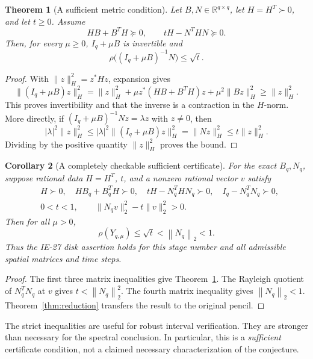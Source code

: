 \documentclass[11pt,letterpaper]{article}
\newtheorem{theorem}{Theorem}[section]
\newtheorem{corollary}[theorem]{Corollary}
\theoremstyle{remark}
\newcommand{\R}{\mathbb R}
\newcommand{\Id}{I}
\newcommand{\norm}[1]{\left\|#1\right\|_2}
\begin{document}
\begin{theorem}[A sufficient metric condition]\label{thm:energy}
Let \(B,N\in\R^{q\times q}\), let \(H=H^T\succ0\), and let \(t\ge0\).
Assume
\begin{equation}\label{eq:LMIs}
 HB+B^TH\succeq0,\qquad tH-N^THN\succeq0.
\end{equation}
Then, for every \(\mu\ge0\), \(\Id_q+\mu B\) is invertible and
\begin{equation}\label{eq:energy-result}
 \rho\big((\Id_q+\mu B)^{-1}N\big)\le\sqrt t.
\end{equation}
\end{theorem}
\begin{proof}
With \(\|z\|_H^2=z^*Hz\), expansion gives
\[
 \|(\Id_q+\mu B)z\|_H^2
 =\|z\|_H^2+\mu z^*(HB+B^TH)z+\mu^2\|Bz\|_H^2
 \ge\|z\|_H^2.
\]
This proves invertibility and that the inverse is a contraction in the
\(H\)-norm. More directly, if
\((\Id_q+\mu B)^{-1}Nz=\lambda z\) with \(z\ne0\), then
\[
 |\lambda|^2\|z\|_H^2
 \le |\lambda|^2\|(\Id_q+\mu B)z\|_H^2
 =\|Nz\|_H^2\le t\|z\|_H^2.
\]
Dividing by the positive quantity \(\|z\|_H^2\) proves the bound.
\end{proof}

\begin{corollary}[A completely checkable sufficient certificate]\label{cor:cert}
For the exact \(B_q,N_q\), suppose rational data \(H=H^T\), \(t\), and a
nonzero rational vector \(v\) satisfy
\begin{align}\label{eq:cert}
&H\succ0,\quad HB_q+B_q^TH\succ0,\quad
 tH-N_q^THN_q\succ0,\quad \Id_q-N_q^TN_q\succ0,\\
&0<t<1,\qquad \|N_qv\|_2^2-t\|v\|_2^2>0.\nonumber
\end{align}
Then for all \(\mu>0\),
\begin{equation}\label{eq:chain}
 \rho(Y_{q,\mu})\le\sqrt t<\norm{N_q}<1.
\end{equation}
Thus the IE-27 disk assertion holds for this stage number and all admissible
spatial matrices and time steps.
\end{corollary}
\begin{proof}
The first three matrix inequalities give Theorem~\ref{thm:energy}.
The Rayleigh quotient of \(N_q^TN_q\) at \(v\) gives \(t<\norm{N_q}^2\).
The fourth matrix inequality gives \(\norm{N_q}<1\).
Theorem~\ref{thm:reduction} transfers the result to the original pencil.
\end{proof}

The strict inequalities are useful for robust interval verification. They are
stronger than necessary for the spectral conclusion. In particular, this is a
\emph{sufficient} certificate condition, not a claimed necessary characterization
of the conjecture.
\end{document}

